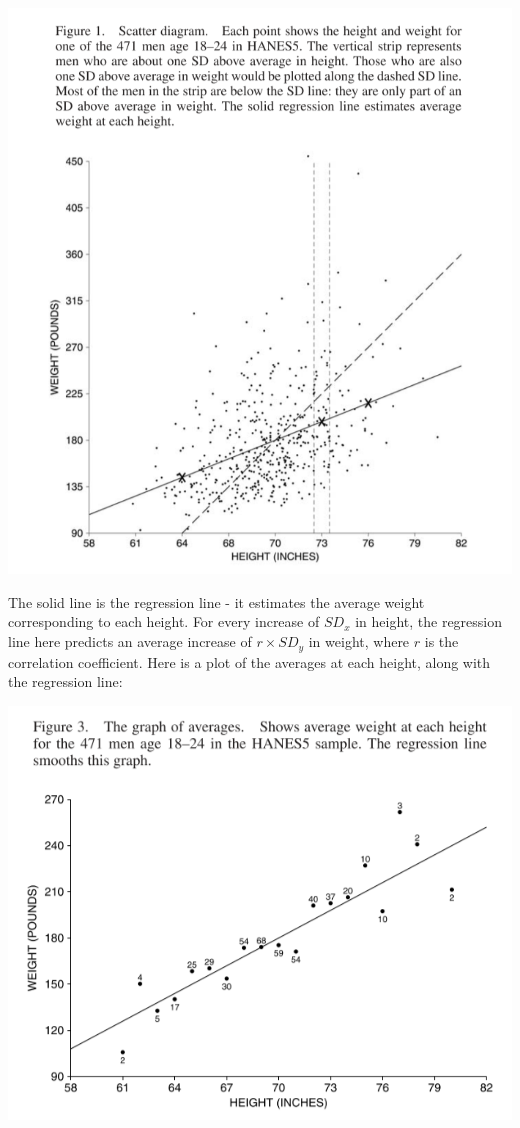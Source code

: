 \documentclass[
]{book}
\begin{document}
\includegraphics{images/Ch10Img01.png}

The solid line is the regression line - it estimates the average weight corresponding to each height. For every increase of \(SD_x\) in height, the regression line here predicts an average increase of \(r\times SD_y\) in weight, where \(r\) is the correlation coefficient. Here is a plot of the averages at each height, along with the regression line:

\includegraphics{images/Ch10Img02.png}
\end{document}

